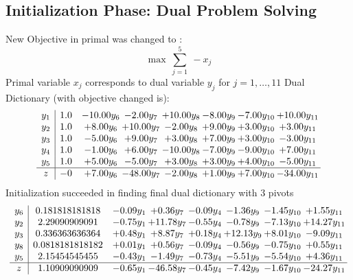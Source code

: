 \documentclass[9pt]{article}
\begin{document}
\subsection{Initialization Phase: Dual Problem Solving}
New Objective in primal was changed to : \[ \max\ \sum_{j=1}^{5}\ - x_j \] 
Primal variable $x_j$ corresponds to dual variable $y_j$ for $j = 1,\ldots,11$
Dual Dictionary (with objective changed is): 
\[\begin{array}{c| c c@{\hskip 2pt} c@{\hskip 2pt} c@{\hskip 2pt} c@{\hskip 2pt} c@{\hskip 2pt} c@{\hskip 2pt} }
 y_{1}   &  1.0 & -10.00 y_{6} & -2.00 y_{7} & + 10.00 y_{8} & -8.00 y_{9} & -7.00 y_{10} & + 10.00 y_{11}\\
 y_{2}   &  1.0 & +  8.00 y_{6} & + 10.00 y_{7} & -2.00 y_{8} & +  9.00 y_{9} & +  3.00 y_{10} & +  3.00 y_{11}\\
 y_{3}   &  1.0 & -5.00 y_{6} & +  9.00 y_{7} & +  3.00 y_{8} & +  7.00 y_{9} & +  3.00 y_{10} & -3.00 y_{11}\\
 y_{4}   &  1.0 & -1.00 y_{6} & +  6.00 y_{7} & -10.00 y_{8} & -7.00 y_{9} & -9.00 y_{10} & +  7.00 y_{11}\\
 y_{5}   &  1.0 & +  5.00 y_{6} & -5.00 y_{7} & +  3.00 y_{8} & +  3.00 y_{9} & +  4.00 y_{10} & -5.00 y_{11}\\
\hline
z    &  -0 & +  7.00 y_{6} & -48.00 y_{7} & -2.00 y_{8} & +  1.00 y_{9} & +  7.00 y_{10} & -34.00 y_{11}\\
\end{array}\]
Initialization succeeded in finding final dual dictionary with 3 pivots
\[\begin{array}{c| c c@{\hskip 2pt} c@{\hskip 2pt} c@{\hskip 2pt} c@{\hskip 2pt} c@{\hskip 2pt} c@{\hskip 2pt} }
 y_{6}   &  0.181818181818 & -0.09 y_{1} & +  0.36 y_{7} & -0.09 y_{4} & -1.36 y_{9} & -1.45 y_{10} & +  1.55 y_{11}\\
 y_{2}   &  2.29090909091 & -0.75 y_{1} & + 11.78 y_{7} & -0.55 y_{4} & -0.78 y_{9} & -7.13 y_{10} & + 14.27 y_{11}\\
 y_{3}   &  0.336363636364 & +  0.48 y_{1} & +  8.87 y_{7} & +  0.18 y_{4} & + 12.13 y_{9} & +  8.01 y_{10} & -9.09 y_{11}\\
 y_{8}   &  0.0818181818182 & +  0.01 y_{1} & +  0.56 y_{7} & -0.09 y_{4} & -0.56 y_{9} & -0.75 y_{10} & +  0.55 y_{11}\\
 y_{5}   &  2.15454545455 & -0.43 y_{1} & -1.49 y_{7} & -0.73 y_{4} & -5.51 y_{9} & -5.54 y_{10} & +  4.36 y_{11}\\
\hline
z    &  1.10909090909 & -0.65 y_{1} & -46.58 y_{7} & -0.45 y_{4} & -7.42 y_{9} & -1.67 y_{10} & -24.27 y_{11}\\
\end{array}\]
\end{document}
